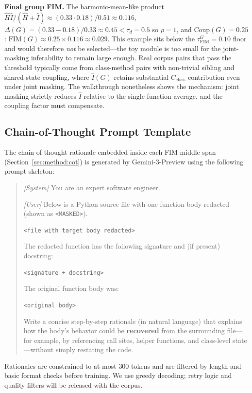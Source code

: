 \textbf{Final group FIM.} The harmonic-mean-like product
$\hat{H}\hat{I}/(\hat{H}+\hat{I})\!\approx\!(0.33\!\cdot\!0.18)/0.51\!\approx\!0.116$,
$\Delta(G)\!=\!(0.33-0.18)/0.33\!\approx\!0.45<\tau_d=0.5$ so
$\rho=1$, and $\mathrm{Coup}(G)=0.25$:
$\mathrm{FIM}(G)\approx 0.25\!\times\!0.116\!\approx\!0.029$. This
example sits below the $\tau^G_{\mathrm{FIM}}\!=\!0.10$ floor and would
therefore \emph{not} be selected---the toy module is too small for the
joint-masking inferability to remain large enough. Real corpus pairs
that pass the threshold typically come from class-method pairs with
non-trivial sibling and shared-state coupling, where $\hat{I}(G)$
retains substantial $C_{\mathrm{class}}$ contribution even under joint
masking. The walkthrough nonetheless shows the mechanism: joint masking
strictly reduces $\hat{I}$ relative to the single-function average,
and the coupling factor must compensate.

\subsection{Chain-of-Thought Prompt Template}
\label{app:algo:cot}

The chain-of-thought rationale embedded inside each FIM middle span
(Section~\ref{sec:method:cot}) is generated by Gemini-3-Preview using
the following prompt skeleton:

\begin{quote}\small
\textit{[System]} You are an expert software engineer.

\noindent\textit{[User]} Below is a Python source file with one function
body redacted (shown as \texttt{<MASKED>}).

\noindent\texttt{<file with target body redacted>}

\noindent The redacted function has the following signature and (if
present) docstring:

\noindent\texttt{<signature + docstring>}

\noindent The original function body was:

\noindent\texttt{<original body>}

\noindent Write a concise step-by-step rationale (in natural language)
that explains how the body's behavior could be \textbf{recovered} from
the surrounding file---for example, by referencing call sites, helper
functions, and class-level state---without simply restating the code.
\end{quote}

Rationales are constrained to at most $300$ tokens and are filtered by
length and basic format checks before training. We use greedy decoding;
retry logic and quality filters will be released with the corpus.

